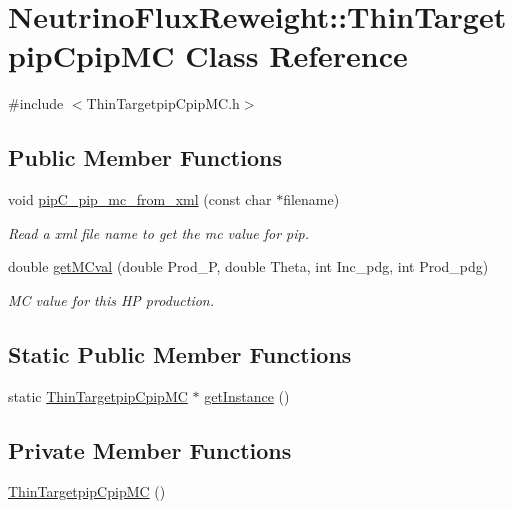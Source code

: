 \hypertarget{class_neutrino_flux_reweight_1_1_thin_targetpip_cpip_m_c}{\section{Neutrino\-Flux\-Reweight\-:\-:Thin\-Targetpip\-Cpip\-M\-C Class Reference}
\label{class_neutrino_flux_reweight_1_1_thin_targetpip_cpip_m_c}
}


{\ttfamily \#include $<$Thin\-Targetpip\-Cpip\-M\-C.\-h$>$}

\subsection*{Public Member Functions}
\begin{DoxyCompactItemize}
\item 
void \hyperlink{class_neutrino_flux_reweight_1_1_thin_targetpip_cpip_m_c_acfe11777379cb5ef7cd507bbd1bf1f0c}{pip\-C\-\_\-pip\-\_\-mc\-\_\-from\-\_\-xml} (const char $\ast$filename)
\begin{DoxyCompactList}\small\item\em Read a xml file name to get the mc value for pip. \end{DoxyCompactList}\item 
double \hyperlink{class_neutrino_flux_reweight_1_1_thin_targetpip_cpip_m_c_ace3b2d6e8dd85ebee74b5169d335ee24}{get\-M\-Cval} (double Prod\-\_\-\-P, double Theta, int Inc\-\_\-pdg, int Prod\-\_\-pdg)
\begin{DoxyCompactList}\small\item\em M\-C value for this H\-P production. \end{DoxyCompactList}\end{DoxyCompactItemize}
\subsection*{Static Public Member Functions}
\begin{DoxyCompactItemize}
\item 
static \hyperlink{class_neutrino_flux_reweight_1_1_thin_targetpip_cpip_m_c}{Thin\-Targetpip\-Cpip\-M\-C} $\ast$ \hyperlink{class_neutrino_flux_reweight_1_1_thin_targetpip_cpip_m_c_aeeb5ad3ed4803b1122286f49d1897729}{get\-Instance} ()
\end{DoxyCompactItemize}
\subsection*{Private Member Functions}
\begin{DoxyCompactItemize}
\item 
\hyperlink{class_neutrino_flux_reweight_1_1_thin_targetpip_cpip_m_c_aa4e97ed5ae221d30ab28db20322e09b9}{Thin\-Targetpip\-Cpip\-M\-C} ()
\end{DoxyCompactItemize}
